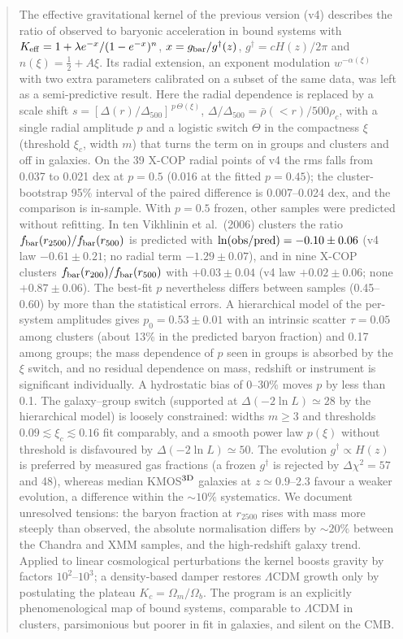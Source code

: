 \documentclass[11pt,a4paper]{article}
\newcommand{\gdag}{g^{\dagger}}
\newcommand{\Keff}{K_{\rm eff}}
\newcommand{\fbar}{f_{\rm bar}}
\begin{document}
\begin{abstract}
\noindent
The effective gravitational kernel of the previous version (v4) describes the ratio of observed to baryonic acceleration in bound systems with $\Keff = 1+\lambda e^{-x}/(1-e^{-x})^{n}$, $x=g_{\rm bar}/\gdag(z)$, $\gdag=cH(z)/2\pi$ and $n(\xi)=\tfrac12+A\xi$. Its radial extension, an exponent modulation $w^{-\alpha(\xi)}$ with two extra parameters calibrated on a subset of the same data, was left as a semi-predictive result. Here the radial dependence is replaced by a scale shift $s=[\Delta(r)/\Delta_{500}]^{\,p\,\Theta(\xi)}$, $\Delta/\Delta_{500}=\bar\rho(<r)/500\rho_c$, with a single radial amplitude $p$ and a logistic switch $\Theta$ in the compactness $\xi$ (threshold $\xi_c$, width $m$) that turns the term on in groups and clusters and off in galaxies. On the 39 X-COP radial points of v4 the rms falls from 0.037 to 0.021 dex at $p=0.5$ (0.016 at the fitted $p=0.45$); the cluster-bootstrap 95\% interval of the paired difference is 0.007--0.024 dex, and the comparison is in-sample. With $p=0.5$ frozen, other samples were predicted without refitting. In ten Vikhlinin et al.\ (2006) clusters the ratio $\fbar(r_{2500})/\fbar(r_{500})$ is predicted with $\ln({\rm obs/pred})=-0.10\pm0.06$ (v4 law $-0.61\pm0.21$; no radial term $-1.29\pm0.07$), and in nine X-COP clusters $\fbar(r_{200})/\fbar(r_{500})$ with $+0.03\pm0.04$ (v4 law $+0.02\pm0.06$; none $+0.87\pm0.06$). The best-fit $p$ nevertheless differs between samples (0.45--0.60) by more than the statistical errors. A hierarchical model of the per-system amplitudes gives $p_0=0.53\pm0.01$ with an intrinsic scatter $\tau=0.05$ among clusters (about 13\% in the predicted baryon fraction) and 0.17 among groups; the mass dependence of $p$ seen in groups is absorbed by the $\xi$ switch, and no residual dependence on mass, redshift or instrument is significant individually. A hydrostatic bias of 0--30\% moves $p$ by less than 0.1. The galaxy--group switch (supported at $\Delta(-2\ln L)\simeq28$ by the hierarchical model) is loosely constrained: widths $m\ge3$ and thresholds $0.09\lesssim\xi_c\lesssim0.16$ fit comparably, and a smooth power law $p(\xi)$ without threshold is disfavoured by $\Delta(-2\ln L)\simeq50$. The evolution $\gdag\propto H(z)$ is preferred by measured gas fractions (a frozen $\gdag$ is rejected by $\Delta\chi^2=57$ and 48), whereas median KMOS$^{\rm 3D}$ galaxies at $z\simeq0.9$--2.3 favour a weaker evolution, a difference within the $\sim10\%$ systematics. We document unresolved tensions: the baryon fraction at $r_{2500}$ rises with mass more steeply than observed, the absolute normalisation differs by $\sim20\%$ between the Chandra and XMM samples, and the high-redshift galaxy trend. Applied to linear cosmological perturbations the kernel boosts gravity by factors $10^2$--$10^3$; a density-based damper restores $\Lambda$CDM growth only by postulating the plateau $K_c=\Omega_m/\Omega_b$. The program is an explicitly phenomenological map of bound systems, comparable to $\Lambda$CDM in clusters, parsimonious but poorer in fit in galaxies, and silent on the CMB.
\end{abstract}
\end{document}

